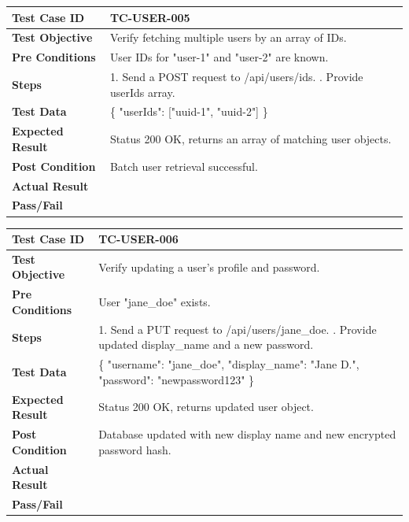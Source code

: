 \begin{longtable}{|p{}|p{}|}
\hline
\textbf{Test Case ID} & TC-USER-005 \\ \hline
\textbf{Test Objective} & Verify fetching multiple users by an array of IDs. \\ \hline
\textbf{Pre Conditions} & User IDs for "user-1" and "user-2" are known. \\ \hline
\textbf{Steps} & 
1. Send a POST request to /api/users/ids. \newline
2. Provide userIds array. \\ \hline
\textbf{Test Data} & \{ "userIds": ["uuid-1", "uuid-2"] \} \\ \hline
\textbf{Expected Result} & Status 200 OK, returns an array of matching user objects. \\ \hline
\textbf{Post Condition} & Batch user retrieval successful. \\ \hline
\textbf{Actual Result} &  \\ \hline
\textbf{Pass/Fail} &  \\ \hline
\end{longtable}

\begin{longtable}{|p{}|p{}|}
\hline
\textbf{Test Case ID} & TC-USER-006 \\ \hline
\textbf{Test Objective} & Verify updating a user's profile and password. \\ \hline
\textbf{Pre Conditions} & User "jane\_doe" exists. \\ \hline
\textbf{Steps} & 
1. Send a PUT request to /api/users/jane\_doe. \newline
2. Provide updated display\_name and a new password. \\ \hline
\textbf{Test Data} & \{ "username": "jane\_doe", "display\_name": "Jane D.", "password": "newpassword123" \} \\ \hline
\textbf{Expected Result} & Status 200 OK, returns updated user object. \\ \hline
\textbf{Post Condition} & Database updated with new display name and new encrypted password hash. \\ \hline
\textbf{Actual Result} &  \\ \hline
\textbf{Pass/Fail} &  \\ \hline
\end{longtable}

